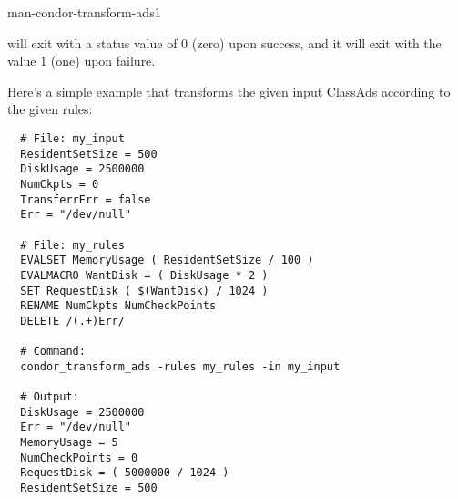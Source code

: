 \begin{ManPage}{}{man-condor-transform-ads}{1}
\ExitStatus

 will exit with a status value of 0 (zero) upon success,
and it will exit with the value 1 (one) upon failure.

\Examples

Here's a simple example that transforms the given input ClassAds according
to the given rules:

\begin{verbatim}
  # File: my_input
  ResidentSetSize = 500
  DiskUsage = 2500000
  NumCkpts = 0
  TransferrErr = false
  Err = "/dev/null"

  # File: my_rules
  EVALSET MemoryUsage ( ResidentSetSize / 100 )
  EVALMACRO WantDisk = ( DiskUsage * 2 )
  SET RequestDisk ( $(WantDisk) / 1024 )
  RENAME NumCkpts NumCheckPoints
  DELETE /(.+)Err/

  # Command:
  condor_transform_ads -rules my_rules -in my_input

  # Output:
  DiskUsage = 2500000
  Err = "/dev/null"
  MemoryUsage = 5
  NumCheckPoints = 0
  RequestDisk = ( 5000000 / 1024 )
  ResidentSetSize = 500
\end{verbatim}

\end{ManPage}

